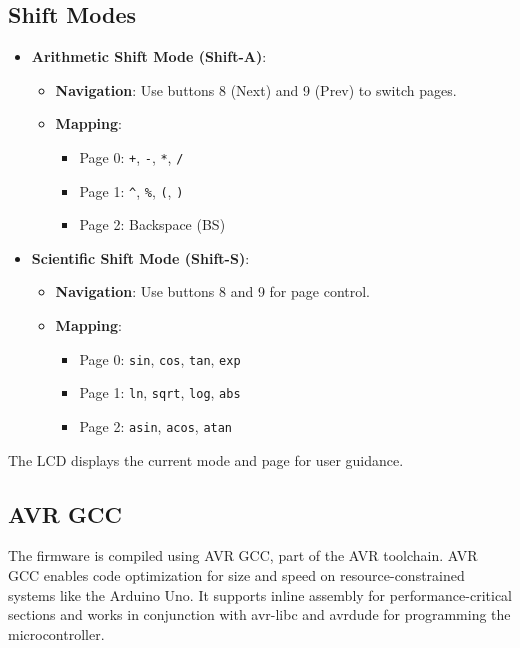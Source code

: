 \documentclass{article}
\theoremstyle{remark}
\begin{document}
\subsection{Shift Modes}
\begin{itemize}[noitemsep]
    \item \textbf{Arithmetic Shift Mode (Shift-A)}:
    \begin{itemize}[noitemsep]
        \item \textbf{Navigation}: Use buttons 8 (Next) and 9 (Prev) to switch pages.
        \item \textbf{Mapping}: 
        \begin{itemize}[noitemsep]
            \item Page 0: \texttt{+}, \texttt{-}, \texttt{*}, \texttt{/}
            \item Page 1: \texttt{\textasciicircum}, \texttt{\%}, \texttt{(}, \texttt{)}
            \item Page 2: Backspace (BS)
        \end{itemize}
    \end{itemize}
    \item \textbf{Scientific Shift Mode (Shift-S)}:
    \begin{itemize}[noitemsep]
        \item \textbf{Navigation}: Use buttons 8 and 9 for page control.
        \item \textbf{Mapping}: 
        \begin{itemize}[noitemsep]
            \item Page 0: \texttt{sin}, \texttt{cos}, \texttt{tan}, \texttt{exp}
            \item Page 1: \texttt{ln}, \texttt{sqrt}, \texttt{log}, \texttt{abs}
            \item Page 2: \texttt{asin}, \texttt{acos}, \texttt{atan}
        \end{itemize}
    \end{itemize}
\end{itemize}
The LCD displays the current mode and page for user guidance.

\subsection{AVR GCC}
The firmware is compiled using AVR GCC, part of the AVR toolchain. AVR GCC enables code optimization for size and speed on resource-constrained systems like the Arduino Uno. It supports inline assembly for performance-critical sections and works in conjunction with avr-libc and avrdude for programming the microcontroller.
\end{document}
